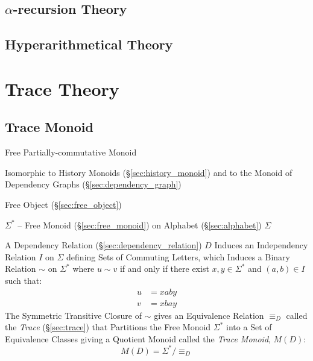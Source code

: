 \subsection{$\alpha$-recursion Theory}\label{sec:alpha_recursion}

\subsection{Hyperarithmetical Theory}\label{sec:hyperarithmetical_theory}



\section{Trace Theory}\label{sec:trace_theory}

\subsection{Trace Monoid}\label{sec:trace_monoid}

Free Partially-commutative Monoid

Isomorphic to History Monoids (\S\ref{sec:history_monoid}) and to the
Monoid of Dependency Graphs (\S\ref{sec:dependency_graph})

Free Object (\S\ref{sec:free_object})

$\Sigma^*$ -- Free Monoid (\S\ref{sec:free_monoid}) on Alphabet
(\S\ref{sec:alphabet}) $\Sigma$

A Dependency Relation (\S\ref{sec:dependency_relation}) $D$ Induces an
Independency Relation $I$ on $\Sigma$ defining Sets of Commuting
Letters, which Induces a Binary Relation $\sim$ on $\Sigma^*$ where $u
\sim v$ if and only if there exist $x,y \in \Sigma^*$ and $(a,b) \in
I$ such that:
\begin{align*}
  u &= xaby \\
  v &= xbay
\end{align*}
The Symmetric Transitive Closure of $\sim$ gives an Equivalence
Relation $\equiv_D$ called the \emph{Trace} (\S\ref{sec:trace}) that
Partitions the Free Monoid $\Sigma^*$ into a Set of Equivalence
Classes giving a Quotient Monoid called the \emph{Trace Monoid},
$M(D)$:
\[
  M(D) = \Sigma^*/\equiv_D
\]

